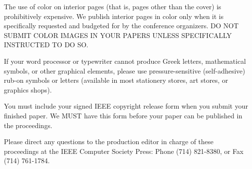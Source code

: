 \documentclass[times, 10pt,twocolumn]{article}
\begin{document}

The use of color on interior pages (that is, pages other than the cover)
is prohibitively expensive. We publish interior pages in color only when
it is specifically requested and budgeted for by the conference
organizers. DO NOT SUBMIT COLOR IMAGES IN YOUR PAPERS UNLESS SPECIFICALLY
INSTRUCTED TO DO SO.


If your word processor or typewriter cannot produce Greek letters,
mathematical symbols, or other graphical elements, please use
pressure-sensitive (self-adhesive) rub-on symbols or letters (available in
most stationery stores, art stores, or graphics shops).


You must include your signed IEEE copyright release form when you submit
your finished paper. We MUST have this form before your paper can be
published in the proceedings.


Please direct any questions to the production editor in charge of these
proceedings at the IEEE Computer Society Press: Phone (714) 821-8380, or
Fax (714) 761-1784.

\nocite{ex1,ex2}  
\end{document}
